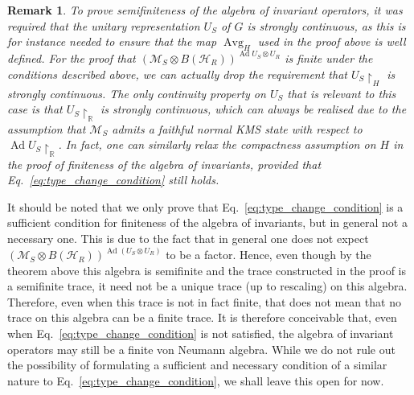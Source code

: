 \documentclass[sn-mathphys-num]{sn-jnl}%
\newcommand{\RR}{\mathbb{R}}
\newcommand{\HH}{\mathcal{H}}
\newcommand{\MM}{\mathcal{M}}
\DeclareMathOperator{\Ad}{Ad}
\numberwithin{equation}{section}
\theoremstyle{thmstyleone}%
\theoremstyle{thmstyletwo}%
\newtheorem{remark}[theorem]{Remark}%
\theoremstyle{thmstylethree}%
\begin{document}
\begin{remark}
    To prove semifiniteness of the algebra of invariant operators, it was required that the unitary representation $U_S$ of $G$ is strongly continuous, as this is for instance needed to ensure that the map $\operatorname{Avg}_H$ used in the proof above is well defined. For the proof that $(\MM_S\otimes B(\HH_R))^{\Ad U_S\otimes U_R}$ is finite under the conditions described above, we can actually drop the requirement that $U_S\restriction_H$ is strongly continuous. The only continuity property on $U_S$ that is relevant to this case is that $U_S\restriction_\RR$ is strongly continuous, which can always be realised due to the assumption that $\MM_S$ admits a faithful normal KMS state with respect to $\Ad U_S\restriction_\RR$. In fact, one can similarly relax the compactness assumption on $H$ in the proof of finiteness of the algebra of invariants, provided that Eq.~\eqref{eq:type_change_condition} still holds.
\end{remark}

It should be noted that we only prove that Eq.\ \eqref{eq:type_change_condition} is a sufficient condition for finiteness of the algebra of invariants, but in general not a necessary one. This is due to the fact that in general one does not expect $(\MM_S\otimes B(\HH_R))^{\Ad(U_S\otimes U_R)}$ to be a factor. Hence, even though by the theorem above this algebra is semifinite and the trace constructed in the proof is a semifinite trace, it need not be a unique trace (up to rescaling) on this algebra. Therefore, even when this trace is not in fact finite, that does not mean that no trace on this algebra can be a finite trace. It is therefore conceivable that, even when Eq.\ \eqref{eq:type_change_condition} is not satisfied, the algebra of invariant operators may still be a finite von Neumann algebra. While we do not rule out the possibility of formulating a sufficient and necessary condition of a similar nature to  Eq.\ \eqref{eq:type_change_condition}, we shall leave this open for now.
\end{document}
